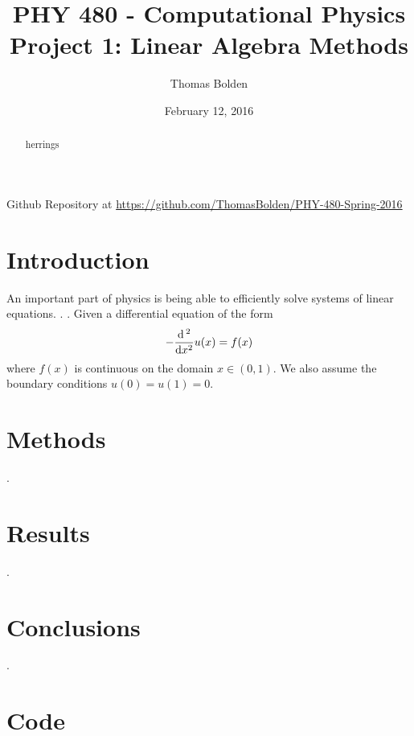 \documentclass[11pt]{article}
\title{PHY 480 - Computational Physics \\ Project 1: Linear Algebra Methods}
\author{Thomas Bolden}
\date{February 12, 2016}
\begin{document}
\maketitle

\centerline{Github Repository at \href{https://github.com/ThomasBolden/PHY-480-Spring-2016}{https://github.com/ThomasBolden/PHY-480-Spring-2016}}

\begin{abstract}

    herrings

\end{abstract}

\vspace{\fill}
\tableofcontents

\pagebreak

\section{Introduction}

    An important part of physics is being able to efficiently solve systems of linear equations. . . Given a differential equation of the form 
    \begin{equation} - \dfrac{\dif\,^2}{\dif x^2} u(x) = f(x) \end{equation}
    where $f(x)$ is continuous on the domain $x \in (0,1)$. We also assume the boundary conditions $u(0)=u(1)=0$. 

\section{Methods}

    .

\section{Results}

    .

\section{Conclusions}

    .

\section{Code}

    

\begin{thebibliography}{1}


\end{thebibliography}
\end{document}
